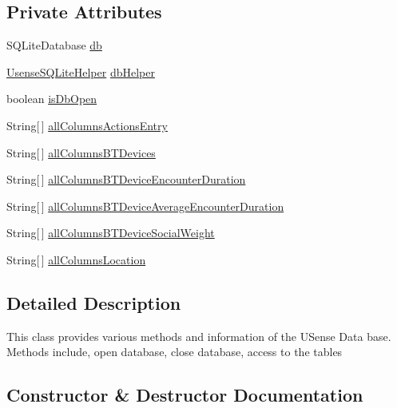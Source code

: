 \subsection*{Private Attributes}
\begin{DoxyCompactItemize}
\item 
S\+Q\+Lite\+Database \hyperlink{classcs_1_1usense_1_1db_1_1_usense_data_source_abb7afa1a31cea70787b725a5e5e4efdd}{db}
\item 
\hyperlink{classcs_1_1usense_1_1db_1_1_usense_s_q_lite_helper}{Usense\+S\+Q\+Lite\+Helper} \hyperlink{classcs_1_1usense_1_1db_1_1_usense_data_source_aa008324e180fdd3b8a05df5592323953}{db\+Helper}
\item 
boolean \hyperlink{classcs_1_1usense_1_1db_1_1_usense_data_source_a2f2c3e38590dacfb49c2d184ff6bd996}{is\+Db\+Open}
\item 
String\mbox{[}$\,$\mbox{]} \hyperlink{classcs_1_1usense_1_1db_1_1_usense_data_source_a688543575d053c8e63be693eec2d31ef}{all\+Columns\+Actions\+Entry}
\item 
String\mbox{[}$\,$\mbox{]} \hyperlink{classcs_1_1usense_1_1db_1_1_usense_data_source_af5076f24e3994d5f0969f5ec40104f0f}{all\+Columns\+B\+T\+Devices}
\item 
String\mbox{[}$\,$\mbox{]} \hyperlink{classcs_1_1usense_1_1db_1_1_usense_data_source_ae0da67fa4d853379fe723ec28a581de0}{all\+Columns\+B\+T\+Device\+Encounter\+Duration}
\item 
String\mbox{[}$\,$\mbox{]} \hyperlink{classcs_1_1usense_1_1db_1_1_usense_data_source_a0b84e480cbc128dfd1931c07b46c98f6}{all\+Columns\+B\+T\+Device\+Average\+Encounter\+Duration}
\item 
String\mbox{[}$\,$\mbox{]} \hyperlink{classcs_1_1usense_1_1db_1_1_usense_data_source_a9948c3c3b6014ecafccea0ce7fa0ba01}{all\+Columns\+B\+T\+Device\+Social\+Weight}
\item 
String\mbox{[}$\,$\mbox{]} \hyperlink{classcs_1_1usense_1_1db_1_1_usense_data_source_a95178df715a8c412f84764ab9be54d81}{all\+Columns\+Location}
\end{DoxyCompactItemize}


\subsection{Detailed Description}
This class provides various methods and information of the U\+Sense Data base. Methods include, open database, close database, access to the tables 

\subsection{Constructor \& Destructor Documentation}
\hypertarget{classcs_1_1usense_1_1db_1_1_usense_data_source_a0e9b00a5b3a1036ec3f4e9e7ce16ed20}{}
